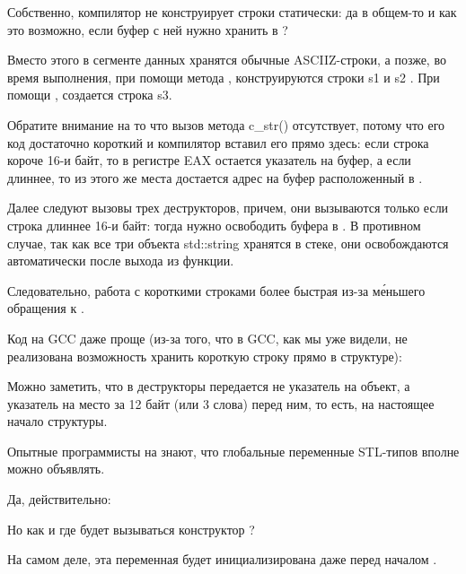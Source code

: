 

Собственно, компилятор не конструирует строки статически: да в общем-то и как
это возможно, если буфер с ней нужно хранить в ?

Вместо этого в сегменте данных хранятся обычные \ac{ASCIIZ}-строки, а позже, во время выполнения, 
при помощи метода , конструируются строки s1 и s2
.
При помощи , создается строка s3.

Обратите внимание на то что вызов метода c\_str() отсутствует,
потому что его код достаточно короткий и компилятор вставил его прямо здесь:
если строка короче 16-и байт, то в регистре EAX остается указатель на буфер,
а если длиннее, то из этого же места достается адрес на буфер расположенный в .

Далее следуют вызовы трех деструкторов, причем, они вызываются только если строка длиннее 16-и байт:
тогда нужно освободить буфера в .
В противном случае, так как все три объекта std::string хранятся в стеке,
они освобождаются автоматически после выхода из функции.

Следовательно, работа с короткими строками более быстрая из-за м\'{е}ньшего обращения к .

Код на GCC даже проще (из-за того, что в GCC, как мы уже видели, не реализована возможность хранить короткую
строку прямо в структуре):



Можно заметить, что в деструкторы передается не указатель на объект,
а указатель на место за 12 байт (или 3 слова) перед ним, то есть, на настоящее начало структуры.

\label{sec:std_string_as_global_variable}

Опытные программисты на \Cpp знают, что глобальные переменные \ac{STL}-типов вполне можно объявлять.

Да, действительно:



Но как и где будет вызываться конструктор ?

На самом деле, эта переменная будет инициализирована даже перед началом \main.

